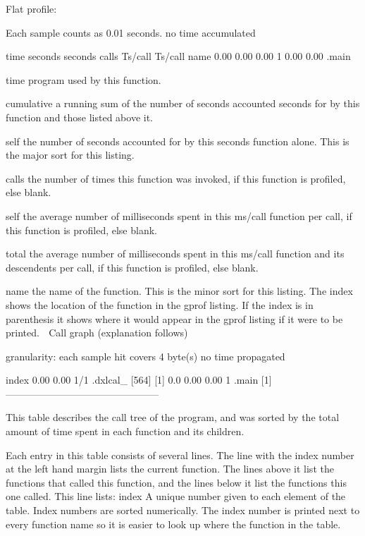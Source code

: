 Flat profile:

Each sample counts as 0.01 seconds.
 no time accumulated

 time   seconds   seconds    calls  Ts/call  Ts/call  name    
  0.00      0.00     0.00        1     0.00     0.00  .main

time       program used by this function.

cumulative a running sum of the number of seconds accounted
 seconds   for by this function and those listed above it.

 self      the number of seconds accounted for by this
seconds    function alone.  This is the major sort for this
           listing.

calls      the number of times this function was invoked, if
           this function is profiled, else blank.
 
 self      the average number of milliseconds spent in this
ms/call    function per call, if this function is profiled,
	   else blank.

 total     the average number of milliseconds spent in this
ms/call    function and its descendents per call, if this 
	   function is profiled, else blank.

name       the name of the function.  This is the minor sort
           for this listing. The index shows the location of
	   the function in the gprof listing. If the index is
	   in parenthesis it shows where it would appear in
	   the gprof listing if it were to be printed.

		     Call graph (explanation follows)


granularity: each sample hit covers 4 byte(s) no time propagated

index %
                0.00    0.00       1/1           .dxlcal_ [564]
[1]      0.0    0.00    0.00       1         .main [1]
-----------------------------------------------

 This table describes the call tree of the program, and was sorted by
 the total amount of time spent in each function and its children.

 Each entry in this table consists of several lines.  The line with the
 index number at the left hand margin lists the current function.
 The lines above it list the functions that called this function,
 and the lines below it list the functions this one called.
 This line lists:
     index	A unique number given to each element of the table.
		Index numbers are sorted numerically.
		The index number is printed next to every function name so
		it is easier to look up where the function in the table.

